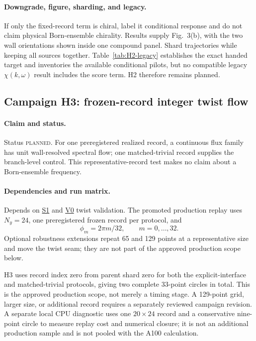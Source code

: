 \documentclass[aps,prx,twocolumn,floatfix,nofootinbib,superscriptaddress,longbibliography]{revtex4-2}
\newcommand{\planned}{\textsc{planned}}
\newcommand{\campref}[1]{\hyperref[camp:#1]{#1}}
\begin{document}
\paragraph*{Downgrade, figure, sharding, and legacy.}
If only the fixed-record term is chiral, label it conditional response and do not claim
physical Born-ensemble chirality.  Results supply Fig.~3(b), with the two wall
orientations shown inside one compound panel.  Shard trajectories while
keeping all sources together.  Table~\ref{tab:H2-legacy} establishes the exact handed
target and inventories the available conditional pilots, but no compatible legacy
$\chi(k,\omega)$ result includes the score term.  H2 therefore remains planned.

\clearpage
\subsection{Campaign H3: frozen-record integer twist flow}
\label{camp:H3}
\paragraph*{Claim and status.}
Status \planned.  For one preregistered realized record, a continuous flux family has
unit wall-resolved spectral flow; one matched-trivial record supplies the branch-level
control.  This representative-record test makes no claim about a Born-ensemble frequency.

\paragraph*{Dependencies and run matrix.}
Depends on \campref{S1} and \campref{V0} twist validation.  The promoted production replay uses
$N_y=24$, one preregistered frozen record per protocol, and
\begin{equation}
 \phi_m=2\pi m/32,\qquad m=0,\ldots,32.
\end{equation}
Optional robustness extensions repeat 65 and 129 points at a representative size and
move the twist seam; they are not part of the approved production scope below.

H3 uses record index zero from parent shard zero for both the explicit-interface and
matched-trivial protocols, giving two complete 33-point circles in total.  This is the
approved production scope, not merely a timing stage.  A 129-point grid, larger size, or
additional record requires a separately reviewed campaign revision.  A separate local CPU
diagnostic uses one $20\times24$ record and a conservative nine-point circle to measure
replay cost and numerical closure; it is not an additional production sample and is not
pooled with the A100 calculation.
\end{document}
